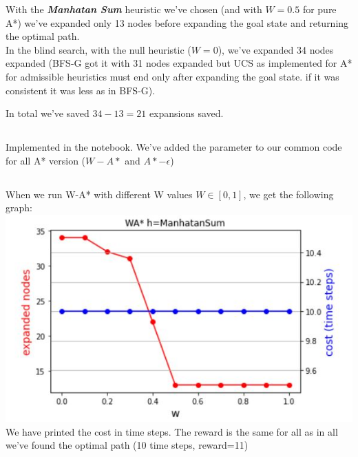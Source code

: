 \documentclass[12pt]{article}
\begin{document}
With the {\textit{\textbf{Manhatan Sum}}} heuristic we've chosen (and with $W=0.5$ for pure A*) we've expanded only 13 nodes before expanding the goal state and returning the optimal path.\\
In the blind search, with the null heuristic ($W=0$), we've expanded 34 nodes  expanded (BFS-G got it with 31 nodes expanded but UCS as implemented for A* for admissible heuristics must end only after expanding the goal state. if it was consistent it was less as in BFS-G).

In total we've saved $34-13=21$ expansions saved.

\subsection{}

Implemented in the notebook. We've added the parameter to our common code for all A* version ($W-A*$ and $A*-\epsilon$)

\subsection{}

When we run W-A* with different W values $W\in[0,1]$, we get the following graph:\\
\includegraphics[scale=1]{w_graph.JPG}\\

We have printed the cost in time steps. The reward is the same for all as in all we've found the optimal path (10 time steps, reward=11)

\subsection{}
\end{document}
